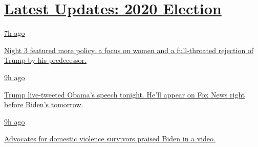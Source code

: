 \hypertarget{latest-updates-2020-election}{%
\section{\texorpdfstring{\href{https://www.nytimes3xbfgragh.onion/live/2020/08/19/us/dnc-convention-election?action=click\&pgtype=Article\&state=default\&region=MAIN_CONTENT_1\&context=storylines_live_updates}{Latest
Updates: 2020
Election}}{Latest Updates: 2020 Election}}\label{latest-updates-2020-election}}

\href{https://www.nytimes3xbfgragh.onion/live/2020/08/19/us/dnc-convention-election?action=click\&pgtype=Article\&state=default\&region=MAIN_CONTENT_1\&context=storylines_live_updates\#night-3-featured-more-policy-a-focus-on-women-and-a-full-throated-rejection-of-trump-by-his-predecessor}{7h
ago}

\href{https://www.nytimes3xbfgragh.onion/live/2020/08/19/us/dnc-convention-election?action=click\&pgtype=Article\&state=default\&region=MAIN_CONTENT_1\&context=storylines_live_updates\#night-3-featured-more-policy-a-focus-on-women-and-a-full-throated-rejection-of-trump-by-his-predecessor}{Night
3 featured more policy, a focus on women and a full-throated rejection
of Trump by his predecessor.}

\href{https://www.nytimes3xbfgragh.onion/live/2020/08/19/us/dnc-convention-election?action=click\&pgtype=Article\&state=default\&region=MAIN_CONTENT_1\&context=storylines_live_updates\#trump-live-tweeted-obamas-speech-tonight-hell-appear-on-fox-news-right-before-bidens-tomorrow}{9h
ago}

\href{https://www.nytimes3xbfgragh.onion/live/2020/08/19/us/dnc-convention-election?action=click\&pgtype=Article\&state=default\&region=MAIN_CONTENT_1\&context=storylines_live_updates\#trump-live-tweeted-obamas-speech-tonight-hell-appear-on-fox-news-right-before-bidens-tomorrow}{Trump
live-tweeted Obama's speech tonight. He'll appear on Fox News right
before Biden's tomorrow.}

\href{https://www.nytimes3xbfgragh.onion/live/2020/08/19/us/dnc-convention-election?action=click\&pgtype=Article\&state=default\&region=MAIN_CONTENT_1\&context=storylines_live_updates\#advocates-for-domestic-violence-survivors-praised-biden-in-a-video}{9h
ago}

\href{https://www.nytimes3xbfgragh.onion/live/2020/08/19/us/dnc-convention-election?action=click\&pgtype=Article\&state=default\&region=MAIN_CONTENT_1\&context=storylines_live_updates\#advocates-for-domestic-violence-survivors-praised-biden-in-a-video}{Advocates
for domestic violence survivors praised Biden in a video.}

